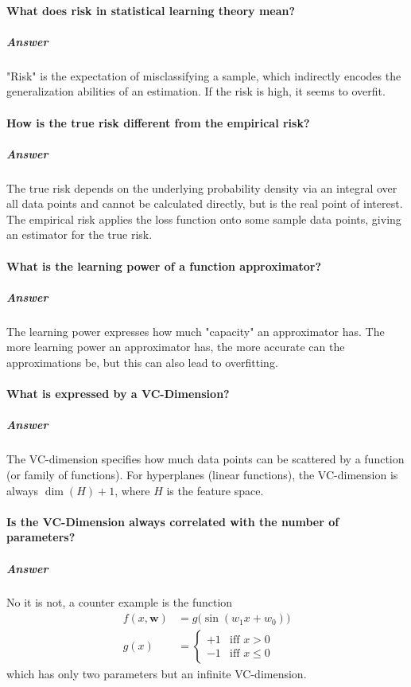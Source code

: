 \documentclass[a4paper, 11pt, accentcolor = tud3b]{tudreport}
\newcommand{\answer}[1]{\subparagraph{Answer} #1}
\renewcommand{\vec}[1]{\mathbf{#1}}
\begin{document}
			\paragraph{What does risk in statistical learning theory mean?}
			\answer{"Risk" is the expectation of misclassifying a sample, which indirectly encodes the generalization abilities of an estimation. If the risk is high, it seems to overfit.}

			\paragraph{How is the true risk different from the empirical risk?}
			\answer{The true risk depends on the underlying probability density via an integral over all data points and cannot be calculated directly, but is the real point of interest. The empirical risk applies the loss function onto some sample data points, giving an estimator for the true risk.}

			\paragraph{What is the learning power of a function approximator?}
			\answer{The learning power expresses how much "capacity" an approximator has. The more learning power an approximator has, the more accurate can the approximations be, but this can also lead to overfitting.}

			\paragraph{What is expressed by a VC-Dimension?}
			\answer{The VC-dimension specifies how much data points can be scattered by a function (or family of functions). For hyperplanes (linear functions), the VC-dimension is always \( \dim(H) + 1 \), where \(H\) is the feature space.}

			\paragraph{Is the VC-Dimension always correlated with the number of parameters?}
			\answer{
				No it is not, a counter example is the function
				\begin{align*}
					f(x, \vec{w}) &= g\big(\sin(w_1 x + w_0)\big) \\
					g(x) &=
						\begin{cases}
							+1 & \textrm{iff } x > 0 \\
							-1 & \textrm{iff } x \leq 0
						\end{cases}
				\end{align*}
				which has only two parameters but an infinite VC-dimension.
			}
\end{document}

